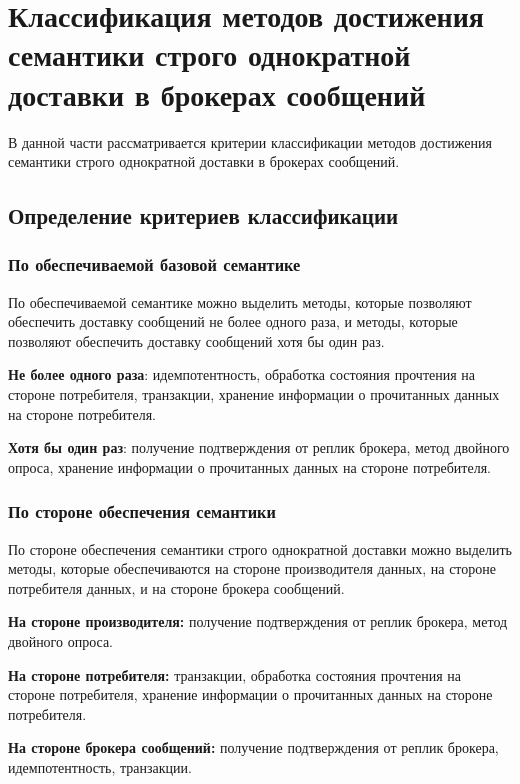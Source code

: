 \chapter[Классификация методов достижения семантики строго однократной доставки в брокерах сообщений]{Классификация методов достижения семантики строго однократной доставки в брокерах сообщений}

В данной части рассматривается критерии классификации методов достижения семантики строго однократной доставки в брокерах сообщений.

\section{Определение критериев классификации}

\subsection{По обеспечиваемой базовой семантике}
По обеспечиваемой семантике можно выделить методы, которые позволяют обеспечить доставку сообщений не более одного раза, и методы, которые позволяют обеспечить доставку сообщений хотя бы один раз.

\textbf{Не более одного раза}: идемпотентность, обработка состояния прочтения на стороне потребителя, транзакции, хранение информации о прочитанных данных на стороне потребителя.

\textbf{Хотя бы один раз}: получение подтверждения от реплик брокера, метод двойного опроса, хранение информации о прочитанных данных на стороне потребителя.

\subsection{По стороне обеспечения семантики}
По стороне обеспечения семантики строго однократной доставки можно выделить методы, которые обеспечиваются на стороне производителя данных, на стороне потребителя данных, и на стороне брокера сообщений.

\textbf{На стороне производителя:} получение подтверждения от реплик брокера, метод двойного опроса.

\textbf{На стороне потребителя:} транзакции, обработка состояния прочтения на стороне потребителя, хранение информации о прочитанных данных на стороне потребителя.

\textbf{На стороне брокера сообщений:} получение подтверждения от реплик брокера, идемпотентность, транзакции.

